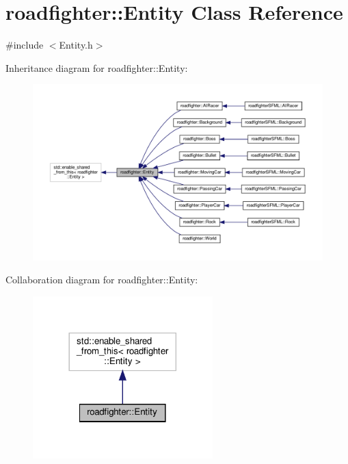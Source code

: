 \hypertarget{classroadfighter_1_1Entity}{}\section{roadfighter\+:\+:Entity Class Reference}
\label{classroadfighter_1_1Entity}


{\ttfamily \#include $<$Entity.\+h$>$}



Inheritance diagram for roadfighter\+:\+:Entity\+:\nopagebreak
\begin{figure}[H]
\begin{center}
\leavevmode
\includegraphics[width=350pt]{classroadfighter_1_1Entity__inherit__graph}
\end{center}
\end{figure}


Collaboration diagram for roadfighter\+:\+:Entity\+:\nopagebreak
\begin{figure}[H]
\begin{center}
\leavevmode
\includegraphics[width=197pt]{classroadfighter_1_1Entity__coll__graph}
\end{center}
\end{figure}

